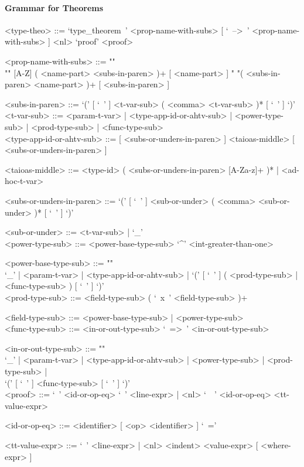 \documentclass{article}
\begin{document}
\newpage

\paragraph{Grammar for Theorems}

\begin{grammar}
<type-theo> ::=
`type_theorem\ ' <prop-name-with-subs> [ `\ -->\ ' <prop-name-with-subs> ] <nl>
`proof' <proof>

<prop-name-with-subs> ::=  ""\\""
[A-Z] ( <name-part> <subs-in-paren> )+ [ <name-part> ]
\alt " "( <subs-in-paren> <name-part> )+ [ <subs-in-paren> ]

<subs-in-paren> ::=
`(' [ `\ ' ] <t-var-sub> ( <comma> <t-var-sub> )* [ `\ ' ] `)'
\\

<t-var-sub> ::=
<param-t-var> | <type-app-id-or-ahtv-sub> | <power-type-sub> | <prod-type-sub> |
<func-type-sub>
\\

<type-app-id-or-ahtv-sub> ::=
[ <subs-or-unders-in-paren> ] <taioas-middle> [ <subs-or-unders-in-paren> ]

<taioas-middle> ::=
<type-id> ( <subs-or-unders-in-paren> [A-Za-z]+ )* | <ad-hoc-t-var>

<subs-or-unders-in-paren> ::=
`(' [ `\ ' ] <sub-or-under> ( <comma> <sub-or-under> )* [ `\ ' ] `)'

<sub-or-under> ::= <t-var-sub> | `_'
\\

<power-type-sub> ::= <power-base-type-sub> `^' <int-greater-than-one>

<power-base-type-sub> ::= ""\\
`_' | <param-t-var> | <type-app-id-or-ahtv-sub> |
`(' [ `\ ' ] ( <prod-type-sub> | <func-type-sub> ) [ `\ ' ] `)'
\\

<prod-type-sub> ::= <field-type-sub> ( `\ x\ ' <field-type-sub> )+

<field-type-sub> ::= <power-base-type-sub> | <power-type-sub>
\\

<func-type-sub> ::= <in-or-out-type-sub> `\ =>\ ' <in-or-out-type-sub>

<in-or-out-type-sub> ::= ""\\
`_' | <param-t-var> | <type-app-id-or-ahtv-sub> | <power-type-sub> |
<prod-type-sub> | \\`(' [ `\ ' ] <func-type-sub> [ `\ ' ] `)'
\\

<proof> ::=
`\ ' <id-or-op-eq> `\ ' <line-expr> |
<nl> `\ \ ' <id-or-op-eq>  <tt-value-expr>

<id-or-op-eq> ::= <identifier> [ <op> <identifier> ] `\ ='

<tt-value-expr> ::=
`\ ' <line-expr> | <nl> <indent> <value-expr> [ <where-expr> ]
\end{grammar}
\end{document}
